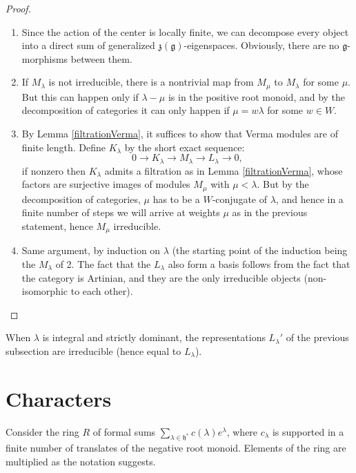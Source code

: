 \begin{proof}
 \begin{enumerate}
  \item Since the action of the center is locally finite, we can decompose every object into a direct sum of generalized $\mathfrak z(\mathfrak g)$-eigenspaces. Obviously, there are no $\mathfrak g$-morphisms between them.
  \item If $M_\lambda$ is not irreducible, there is a nontrivial map from $M_\mu$ to $M_\lambda$ for some $\mu$. But this can happen only if $\lambda-\mu$ is in the positive root monoid, and by the decomposition of categories it can only happen if $\mu=w\lambda$ for some $w\in W$.
  \item By Lemma \ref{filtrationVerma}, it suffices to show that Verma modules are of finite length. Define $K_\lambda$ by the short exact sequence:
$$ 0\to K_\lambda\to M_\lambda\to L_\lambda\to 0,$$
if nonzero then $K_\lambda$ admits a filtration as in Lemma \ref{filtrationVerma}, whose factors are surjective images of modules $M_\mu$ with $\mu < \lambda$. But by the decomposition of categories, $\mu$ has to be a $W$-conjugate of $\lambda$, and hence in a finite number of steps we will arrive at weights $\mu$ as in the previous statement, hence $M_\mu$ irreducible.
  \item Same argument, by induction on $\lambda$ (the starting point of the induction being the $M_\lambda$ of 2. The fact that the $L_\lambda$ also form a basis follows from the fact that the category is Artinian, and they are the only irreducible objects (non-isomorphic to each other). 
 \end{enumerate}
\end{proof}


\begin{proposition}
 When $\lambda$ is integral and strictly dominant, the representations $L_\lambda'$ of the previous subsection are irreducible (hence equal to $L_\lambda$).
\end{proposition}

 
\section{Characters}

Consider the ring $R$ of formal sums $\sum_{\lambda\in \mathfrak h^*} c(\lambda) e^\lambda$, where $c_\lambda$ is supported in a finite number of translates of the negative root monoid. Elements of the ring are multiplied as the notation suggests.

